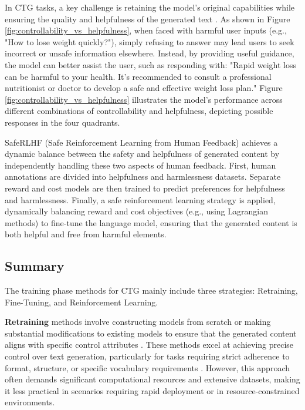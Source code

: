 \documentclass[acmsmall, screen]{acmart}
\begin{document}
In CTG tasks, a key challenge is retaining the model's original capabilities while ensuring the quality and helpfulness of the generated text \cite{hua_arxiv24_TrustAgent}. As shown in Figure \ref{fig:controllability_vs_helpfulness}, when faced with harmful user inputs (e.g., "How to lose weight quickly?"), simply refusing to answer may lead users to seek incorrect or unsafe information elsewhere. Instead, by providing useful guidance, the model can better assist the user, such as responding with: "Rapid weight loss can be harmful to your health. It's recommended to consult a professional nutritionist or doctor to develop a safe and effective weight loss plan." Figure \ref{fig:controllability_vs_helpfulness} illustrates the model's performance across different combinations of controllability and helpfulness, depicting possible responses in the four quadrants.

SafeRLHF (Safe Reinforcement Learning from Human Feedback) \cite{dai_iclr24_SafeRLHF} achieves a dynamic balance between the safety and helpfulness of generated content by independently handling these two aspects of human feedback. First, human annotations are divided into helpfulness and harmlessness datasets. Separate reward and cost models are then trained to predict preferences for helpfulness and harmlessness. Finally, a safe reinforcement learning strategy is applied, dynamically balancing reward and cost objectives (e.g., using Lagrangian methods) to fine-tune the language model, ensuring that the generated content is both helpful and free from harmful elements.

\subsection{Summary}

The training phase methods for CTG mainly include three strategies: Retraining, Fine-Tuning, and Reinforcement Learning.

\textbf{Retraining} methods involve constructing models from scratch or making substantial modifications to existing models to ensure that the generated content aligns with specific control attributes \cite{keskar_arxiv19_Ctrl,chan_iclr21_CoCon,arora_aacl22_Director}. These methods excel at achieving precise control over text generation, particularly for tasks requiring strict adherence to format, structure, or specific vocabulary requirements \cite{zhang_emnlp20_POINTER,he_emnlp21_CBART,hua_emnlp20_PAIR}. However, this approach often demands significant computational resources and extensive datasets, making it less practical in scenarios requiring rapid deployment or in resource-constrained environments.
\end{document}
